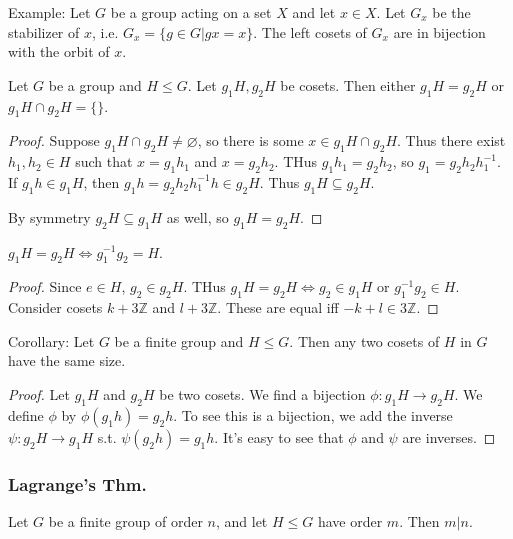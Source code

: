 \documentclass{scrartcl}
\begin{document}
Example: Let $G$ be a group acting on a set $X$ and let $x \in X$. Let $G_x$ be the stabilizer of $x$, i.e. $G_x = \{ g \in G | gx = x \}$. The left cosets of $G_x$ are in bijection with the orbit of $x$.

\begin{proposition}
    Let $G$ be a group and $H \le G$. Let $g_1H, g_2H$ be cosets. Then either $g_1H = g_2H$ or $g_1H \cap g_2H = \{\}$.
\end{proposition}

\begin{proof}
    Suppose $g_1H \cap g_2 H \neq \varnothing$, so there is some $x \in g_1H \cap g_2H$. Thus there exist $h_1,h_2 \in H$ such that $x = g_1h_1$ and $x = g_2h_2$. THus $g_1h_1 = g_2h_2$, so $g_1 = g_2h_2h_1^{-1}$. If $g_1h \in g_1H$, then $g_1h = g_2h_2h_1^{-1}h \in g_2H$. Thus $g_1H \subseteq g_2H$.
    
    By symmetry $g_2H \subseteq g_1H$ as well, so $g_1H = g_2H$.
\end{proof}

\begin{proposition}
    $g_1H = g_2H \iff g_1^{-1}g_2 = H$.
\end{proposition}

\begin{proof}
    Since $e \in H$, $g_2 \in g_2H$. THus $g_1H = g_2H \iff g_2 \in g_1H$ or $g_1^{-1}g_2 \in H$. Consider cosets $k + 3\mathbb{Z}$ and $l + 3\mathbb{Z}$. These are equal iff $-k + l \in 3\mathbb{Z}$. 
\end{proof}

\begin{proposition}
    Corollary: Let $G$ be a finite group and $H \le G$. Then any two cosets of $H$ in $G$ have the same size. 
\end{proposition}

\begin{proof}
    Let $g_1H$ and $g_2H$ be two cosets. We find a bijection $\phi : g_1H \rightarrow g_2H$. We define $\phi$ by $\phi(g_1h) = g_2h$. To see this is a bijection, we add the inverse $\psi : g_2H \rightarrow g_1H$ s.t. $\psi(g_2h) = g_1h$. It's easy to see that $\phi$ and $\psi$ are inverses.
\end{proof}

\subsubsection{Lagrange's Thm.}
\begin{theorem}[Lagrange]
    Let $G$ be a finite group of order $n$, and let $H \le G$ have order $m$. Then $m | n$. 
\end{theorem}
\end{document}

